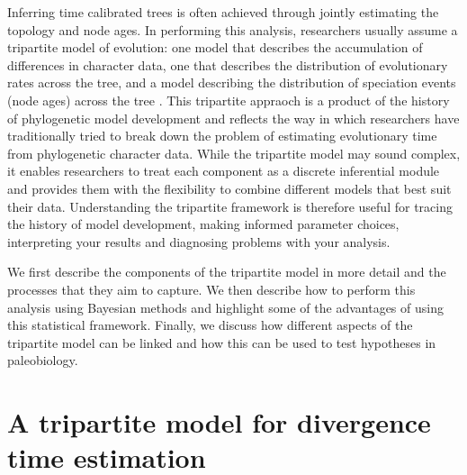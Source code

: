 \documentclass[11pt]{article}
\begin{document}
Inferring time calibrated trees is often achieved through jointly estimating the topology and node ages.
In performing this analysis, researchers usually assume a tripartite model of evolution: one model that describes the accumulation of differences in character data, one that describes the distribution of evolutionary rates across the tree, and a model describing the distribution of speciation events (node ages) across the tree \cite{Thorne1998,Kishino2001,Yang2006,Drummond2006}.
This tripartite appraoch is a product of the history of phylogenetic model development and reflects the way in which researchers have traditionally tried to break down the problem of estimating evolutionary time from phylogenetic character data.
While the tripartite model may sound complex, it enables researchers to treat each component as a discrete inferential module and provides them with the flexibility to combine different models that best suit their data.
Understanding the tripartite framework is therefore useful for tracing the history of model development, making informed parameter choices, interpreting your results and diagnosing problems with your analysis.

We first describe the components of the tripartite model in more detail and the processes that they aim to capture.
We then describe how to perform this analysis using Bayesian methods and highlight some of the advantages of using this statistical framework.
Finally, we discuss how different aspects of the tripartite model can be linked and how this can be used to test hypotheses in paleobiology.
 

\section{A tripartite model for divergence time estimation}
 
\end{document}
